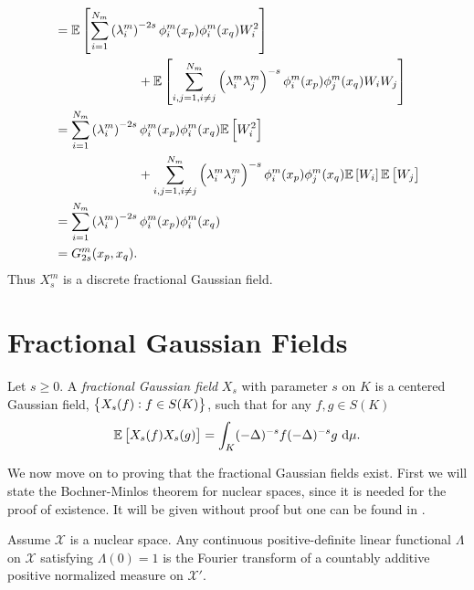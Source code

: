 \begin{example}
\begin{align}
		&= \e \left[\sum_{i=1}^{N_m}\left(\lambda_i^{m}\right)^{-2s}\phi^{m}_{i}(x_p)\phi^{m}_{i}(x_q)W_i^2\right]\\ &\phantom{a} \qquad \qquad \qquad +\e \left[\sum_{i,j=1, i \neq j }^{N_m}\left(\lambda_i^{m}\lambda_j^{m}\right)^{-s}\phi^{m}_{i}(x_p) \phi^{m}_{j}(x_q)W_iW_j\right] \\
		&= \sum_{i=1}^{N_m}\left(\lambda_i^{m}\right)^{-2s}\phi^{m}_{i}(x_p)\phi^{m}_{i}(x_q)\e \left[W_i^2\right]\\  
		&\phantom{a} \qquad \qquad \qquad +\sum_{i,j=1, i \neq j }^{N_m}\left(\lambda_i^{m}\lambda_j^{m}\right)^{-s}\phi^{m}_{i}(x_p) \phi^{m}_{j}(x_q)\e \left[W_i\right] \e \left[W_j\right] \\
		&= \sum_{i=1}^{N_m}\left(\lambda_i^{m}\right)^{-2s}\phi^{m}_{i}(x_p)\phi^{m}_{i}(x_q) \\
		&= G_{2s}^{m}(x_p,x_q).
	\end{align}
	Thus $X_s^{m}$ is a discrete fractional Gaussian field.
\end{example}

\section{Fractional Gaussian Fields}

\begin{defi}\label{fracGaussianField}
	Let $s \geq 0$. A \emph{fractional Gaussian field} $X_s$ with parameter $s$ on $K$ is a centered Gaussian field, $\cbr{X_s(f): f \in S(K)}$, such that for any $f,g \in S(K)$
	\begin{equation}
		\mathbb{E} \left[X_s(f) X_s(g)\right] = \int_{K} (-\Delta)^{-s}f (-\Delta)^{-s}g \ \text{d} \mu.
	\end{equation}
\end{defi}

We now move on to proving that the fractional Gaussian fields exist. First we will state the Bochner-Minlos theorem for nuclear spaces, since it is needed for the proof of existence. It will be given without proof but one can be found in \cite[Theorem 2.3.1]{minlos}.

\medskip
\begin{theorem}\label{BochnerMinlos}
	Assume $\mathcal{X}$ is a nuclear space. Any continuous positive-definite linear functional $\Lambda$ on $\mathcal{X}$ satisfying $\Lambda(0) = 1$ is the Fourier transform of a countably additive positive normalized measure on $\mathcal{X}'$.
\end{theorem}

